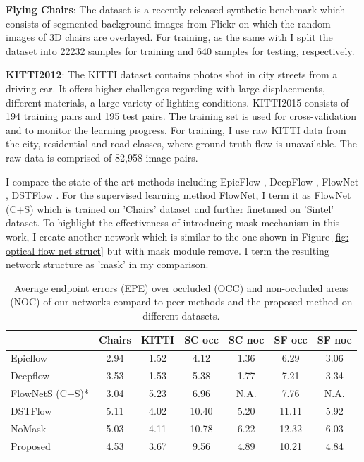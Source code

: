 \documentclass{iitthesis}
\begin{document}
\noindent \textbf{Flying Chairs}: The dataset \cite{DFIB15} is a recently released synthetic benchmark which consists of segmented background images from Flickr on which the random images of 3D chairs are overlayed. For training, as the same with \cite{DFIB15} I split the dataset into 22232 samples for training and 640 samples for testing, respectively.

\noindent \textbf{KITTI2012}: The KITTI dataset \cite{Geiger2012CVPR} contains photos shot in city streets from a driving car. It offers higher challenges regarding with large displacements, different materials, a large variety of lighting conditions. KITTI2015 consists of 194 training pairs and 195 test pairs. The training set is used for cross-validation and to monitor the learning progress. For training, I use raw KITTI data from the city, residential and road classes, where ground truth flow is unavailable. The raw data is comprised of 82,958 image pairs. 

I compare the state of the art methods including EpicFlow \cite{revaud2015epicflow}, DeepFlow \cite{weinzaepfel2013deepflow}, FlowNet \cite{reed2016generative}, DSTFlow \cite{ren2017unsupervised}. For the supervised learning method FlowNet, I term it as FlowNet (C+S) which is trained on 'Chairs' dataset and further finetuned on 'Sintel' dataset. To highlight the effectiveness of introducing mask mechanism in this work, I create another network which is similar to the one shown in Figure \ref{fig: optical flow net struct} but with mask module remove. I term the resulting network structure as 'mask' in my comparison.

\begin{table}[]
\centering
\caption{Average endpoint errors (EPE) over occluded (OCC) and non-occluded areas (NOC) of our networks compard to peer methods and the proposed method on different datasets. }
\label{tab: optical flow comparison}
\begin{tabular}{lcccccc}
\hline
\hline
 & Chairs & KITTI & SC occ & SC noc & SF occ & SF noc \\ \hline
Epicflow & 2.94 & 1.52 & 4.12 & 1.36 & 6.29 & 3.06 \\
Deepflow & 3.53 & 1.53 & 5.38 & 1.77 & 7.21 & 3.34 \\
FlowNetS (C+S)* & 3.04 & 5.23 & 6.96 & N.A. & 7.76 & N.A. \\
DSTFlow & 5.11 & 4.02 & 10.40 & 5.20 & 11.11 & 5.92 \\
NoMask & 5.03 & 4.11 & 10.78 & 6.22 & 12.32 & 6.03 \\
Proposed & 4.53 & 3.67 & 9.56 & 4.89 & 10.21 & 4.84 \\ \hline
\end{tabular}
\end{table}
\end{document}

